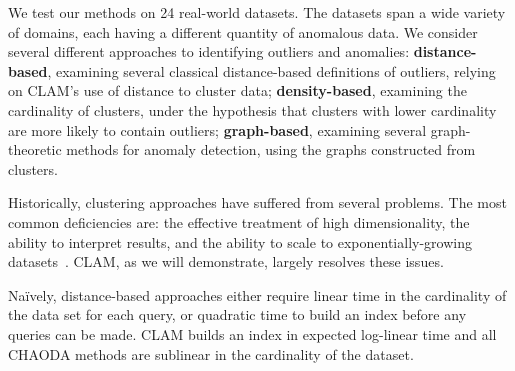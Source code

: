 We test our methods on 24 real-world datasets.
The datasets span a wide variety of domains, each having a different quantity of anomalous data.
We consider several different approaches to identifying outliers and anomalies:
\textbf{distance-based}, examining several classical distance-based definitions of outliers, relying on CLAM's use of distance to cluster data;
\textbf{density-based}, examining the cardinality of clusters, under the hypothesis that clusters with lower cardinality are more likely to contain outliers;
\textbf{graph-based}, examining several graph-theoretic methods for anomaly detection, using the graphs constructed from clusters.

Historically, clustering approaches have suffered from several problems.
The most common deficiencies are: the effective treatment of high dimensionality, the ability to interpret results, and the ability to scale to exponentially-growing datasets~\cite{agrawal1998automatic}.
CLAM, as we will demonstrate, largely resolves these issues.

Na\"ively, distance-based approaches either require linear time in the cardinality of the data set for each query,
or quadratic time to build an index before any queries can be made.
CLAM builds an index in expected log-linear time and all CHAODA methods are sublinear in the cardinality of the dataset.
